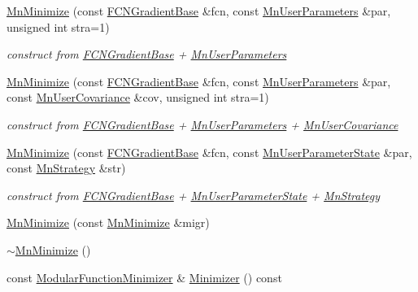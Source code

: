 \begin{DoxyCompactItemize}
\mbox{\hyperlink{classROOT_1_1Minuit2_1_1MnMinimize_a7ae2da481677eb3b7fcf3b77a8dee92b}{Mn\+Minimize}} (const \mbox{\hyperlink{classROOT_1_1Minuit2_1_1FCNGradientBase}{F\+C\+N\+Gradient\+Base}} \&fcn, const \mbox{\hyperlink{classROOT_1_1Minuit2_1_1MnUserParameters}{Mn\+User\+Parameters}} \&par, unsigned int stra=1)
\begin{DoxyCompactList}\small\item\em construct from \mbox{\hyperlink{classROOT_1_1Minuit2_1_1FCNGradientBase}{F\+C\+N\+Gradient\+Base}} + \mbox{\hyperlink{classROOT_1_1Minuit2_1_1MnUserParameters}{Mn\+User\+Parameters}} \end{DoxyCompactList}\item 
\mbox{\hyperlink{classROOT_1_1Minuit2_1_1MnMinimize_a669845a1aaba36456664f1e98a615e25}{Mn\+Minimize}} (const \mbox{\hyperlink{classROOT_1_1Minuit2_1_1FCNGradientBase}{F\+C\+N\+Gradient\+Base}} \&fcn, const \mbox{\hyperlink{classROOT_1_1Minuit2_1_1MnUserParameters}{Mn\+User\+Parameters}} \&par, const \mbox{\hyperlink{classROOT_1_1Minuit2_1_1MnUserCovariance}{Mn\+User\+Covariance}} \&cov, unsigned int stra=1)
\begin{DoxyCompactList}\small\item\em construct from \mbox{\hyperlink{classROOT_1_1Minuit2_1_1FCNGradientBase}{F\+C\+N\+Gradient\+Base}} + \mbox{\hyperlink{classROOT_1_1Minuit2_1_1MnUserParameters}{Mn\+User\+Parameters}} + \mbox{\hyperlink{classROOT_1_1Minuit2_1_1MnUserCovariance}{Mn\+User\+Covariance}} \end{DoxyCompactList}\item 
\mbox{\hyperlink{classROOT_1_1Minuit2_1_1MnMinimize_ae607cd588cff70b64c0705bb86a36ba0}{Mn\+Minimize}} (const \mbox{\hyperlink{classROOT_1_1Minuit2_1_1FCNGradientBase}{F\+C\+N\+Gradient\+Base}} \&fcn, const \mbox{\hyperlink{classROOT_1_1Minuit2_1_1MnUserParameterState}{Mn\+User\+Parameter\+State}} \&par, const \mbox{\hyperlink{classROOT_1_1Minuit2_1_1MnStrategy}{Mn\+Strategy}} \&str)
\begin{DoxyCompactList}\small\item\em construct from \mbox{\hyperlink{classROOT_1_1Minuit2_1_1FCNGradientBase}{F\+C\+N\+Gradient\+Base}} + \mbox{\hyperlink{classROOT_1_1Minuit2_1_1MnUserParameterState}{Mn\+User\+Parameter\+State}} + \mbox{\hyperlink{classROOT_1_1Minuit2_1_1MnStrategy}{Mn\+Strategy}} \end{DoxyCompactList}\item 
\mbox{\hyperlink{classROOT_1_1Minuit2_1_1MnMinimize_a5381e16cfd79c2b4da61e399a6a02b35}{Mn\+Minimize}} (const \mbox{\hyperlink{classROOT_1_1Minuit2_1_1MnMinimize}{Mn\+Minimize}} \&migr)
\item 
\mbox{\hyperlink{classROOT_1_1Minuit2_1_1MnMinimize_ae4544af29d79b1415179ce48c05b9ae0}{$\sim$\+Mn\+Minimize}} ()
\item 
const \mbox{\hyperlink{classROOT_1_1Minuit2_1_1ModularFunctionMinimizer}{Modular\+Function\+Minimizer}} \& \mbox{\hyperlink{classROOT_1_1Minuit2_1_1MnMinimize_a879bb789f98c72f9a90a327fc7bb48fd}{Minimizer}} () const
\end{DoxyCompactItemize}
